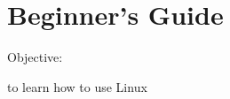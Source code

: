 \documentclass[11pt,a4paper,oneside]{book}
\begin{document}
\pagestyle{empty}



\glsaddall
\glstoctrue
\printglossaries

\cleardoublepage
\printindex


\tableofcontents

\part{Beginner's Guide}

Objective:

to learn how to use Linux

\pagestyle{fancy}





















%
\end{document}
